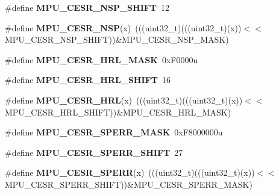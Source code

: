 \begin{DoxyCompactItemize}
\item 
\#define {\bfseries M\+P\+U\+\_\+\+C\+E\+S\+R\+\_\+\+N\+S\+P\+\_\+\+S\+H\+I\+FT}~12\hypertarget{group__MPU__Register__Masks_ga3c9da72b898ef6552faa993528e58157}{}\label{group__MPU__Register__Masks_ga3c9da72b898ef6552faa993528e58157}

\item 
\#define {\bfseries M\+P\+U\+\_\+\+C\+E\+S\+R\+\_\+\+N\+SP}(x)~(((uint32\+\_\+t)(((uint32\+\_\+t)(x))$<$$<$M\+P\+U\+\_\+\+C\+E\+S\+R\+\_\+\+N\+S\+P\+\_\+\+S\+H\+I\+FT))\&M\+P\+U\+\_\+\+C\+E\+S\+R\+\_\+\+N\+S\+P\+\_\+\+M\+A\+SK)\hypertarget{group__MPU__Register__Masks_gae987eb818110ba76cae0547cc549fa92}{}\label{group__MPU__Register__Masks_gae987eb818110ba76cae0547cc549fa92}

\item 
\#define {\bfseries M\+P\+U\+\_\+\+C\+E\+S\+R\+\_\+\+H\+R\+L\+\_\+\+M\+A\+SK}~0x\+F0000u\hypertarget{group__MPU__Register__Masks_gac91de83bf386f4896d634b4283e3ac12}{}\label{group__MPU__Register__Masks_gac91de83bf386f4896d634b4283e3ac12}

\item 
\#define {\bfseries M\+P\+U\+\_\+\+C\+E\+S\+R\+\_\+\+H\+R\+L\+\_\+\+S\+H\+I\+FT}~16\hypertarget{group__MPU__Register__Masks_ga9e19f94c8fa7c703ae194f8df2920795}{}\label{group__MPU__Register__Masks_ga9e19f94c8fa7c703ae194f8df2920795}

\item 
\#define {\bfseries M\+P\+U\+\_\+\+C\+E\+S\+R\+\_\+\+H\+RL}(x)~(((uint32\+\_\+t)(((uint32\+\_\+t)(x))$<$$<$M\+P\+U\+\_\+\+C\+E\+S\+R\+\_\+\+H\+R\+L\+\_\+\+S\+H\+I\+FT))\&M\+P\+U\+\_\+\+C\+E\+S\+R\+\_\+\+H\+R\+L\+\_\+\+M\+A\+SK)\hypertarget{group__MPU__Register__Masks_ga22915a55b129ed8fc33ede59c0b25601}{}\label{group__MPU__Register__Masks_ga22915a55b129ed8fc33ede59c0b25601}

\item 
\#define {\bfseries M\+P\+U\+\_\+\+C\+E\+S\+R\+\_\+\+S\+P\+E\+R\+R\+\_\+\+M\+A\+SK}~0x\+F8000000u\hypertarget{group__MPU__Register__Masks_ga92110b62cfcd6178c2b26e7aaef222b1}{}\label{group__MPU__Register__Masks_ga92110b62cfcd6178c2b26e7aaef222b1}

\item 
\#define {\bfseries M\+P\+U\+\_\+\+C\+E\+S\+R\+\_\+\+S\+P\+E\+R\+R\+\_\+\+S\+H\+I\+FT}~27\hypertarget{group__MPU__Register__Masks_ga69779e128c116e87116f7aa67b9a8dcc}{}\label{group__MPU__Register__Masks_ga69779e128c116e87116f7aa67b9a8dcc}

\item 
\#define {\bfseries M\+P\+U\+\_\+\+C\+E\+S\+R\+\_\+\+S\+P\+E\+RR}(x)~(((uint32\+\_\+t)(((uint32\+\_\+t)(x))$<$$<$M\+P\+U\+\_\+\+C\+E\+S\+R\+\_\+\+S\+P\+E\+R\+R\+\_\+\+S\+H\+I\+FT))\&M\+P\+U\+\_\+\+C\+E\+S\+R\+\_\+\+S\+P\+E\+R\+R\+\_\+\+M\+A\+SK)\hypertarget{group__MPU__Register__Masks_ga9b0a75ff640bd8a5d2ca3604ccee5535}{}\label{group__MPU__Register__Masks_ga9b0a75ff640bd8a5d2ca3604ccee5535}


\end{DoxyCompactItemize}
